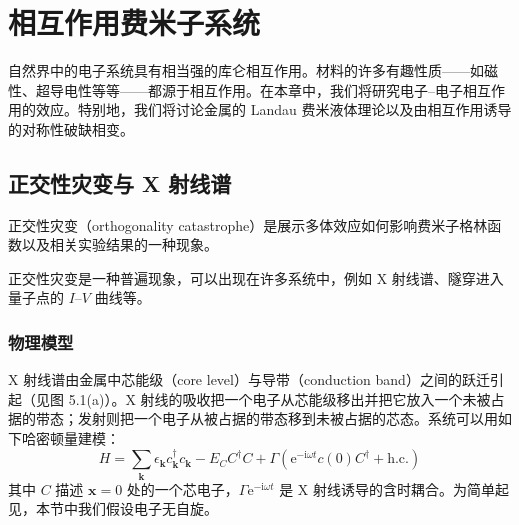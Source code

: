\chapter{相互作用费米子系统}

自然界中的电子系统具有相当强的库仑相互作用。材料的许多有趣性质——如磁性、超导电性等等——都源于相互作用。在本章中，我们将研究电子--电子相互作用的效应。特别地，我们将讨论金属的 Landau 费米液体理论以及由相互作用诱导的对称性破缺相变。

\section{正交性灾变与 X 射线谱}

\begin{keypoints}
\item 正交性灾变（orthogonality catastrophe）是展示多体效应如何影响费米子格林函数以及相关实验结果的一种现象。
\item 正交性灾变是一种普遍现象，可以出现在许多系统中，例如 X 射线谱、隧穿进入量子点的 $I$--$V$ 曲线等。
\end{keypoints}

\subsection{物理模型}

X 射线谱由金属中芯能级（core level）与导带（conduction band）之间的跃迁引起（见图 5.1(a)）。X 射线的吸收把一个电子从芯能级移出并把它放入一个未被占据的带态；发射则把一个电子从被占据的带态移到未被占据的芯态。系统可以用如下哈密顿量建模：
\begin{equation*}
H=\sum_{\pmb{k}}\epsilon_{\pmb{k}}c_{\pmb{k}}^{\dagger}c_{\pmb{k}}-E_CC^{\dagger}C+\Gamma(\mathrm{e}^{-\mathrm{i}\omega t}c(0)C^{\dagger}+\text{h.c.})\tag{5.1.1}
\end{equation*}
其中 $C$ 描述 $\pmb{x}=0$ 处的一个芯电子，$\Gamma\mathrm{e}^{-\mathrm{i}\omega t}$ 是 X 射线诱导的含时耦合。为简单起见，本节中我们假设电子无自旋。


